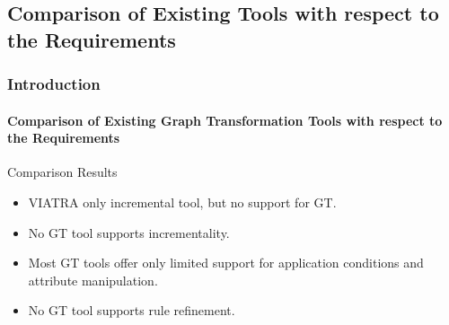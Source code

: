 \subsection{Comparison of Existing Tools with respect to the Requirements}
	\begin{frame}
		\frametitle{Introduction}
		\framesubtitle{Comparison of Existing Graph Transformation Tools with respect to the Requirements}
		\begin{block}{Comparison Results}
			\begin{itemize}
				\item VIATRA only incremental tool, but no support for GT.
				\item No GT tool supports incrementality.
				\item Most GT tools offer only limited support for application conditions and attribute manipulation.
				\item No GT tool supports rule refinement.
			\end{itemize}
		\end{block}
	\end{frame}
